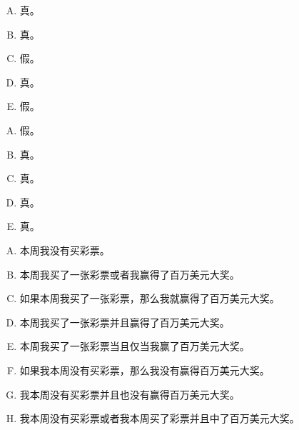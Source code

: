 {{        %
        \begin{practices}
            \begin{enumerate}[A.]
                \item 真。
                \item 真。
                \item 假。
                \item 真。
                \item 假。
            \end{enumerate}
        \end{practices}

        \begin{practices}
            \begin{enumerate}[A.]
                \item 假。
                \item 真。
                \item 真。
                \item 真。
                \item 真。
            \end{enumerate}
        \end{practices}

        \begin{practices}
            \begin{enumerate}[A.]
                \item 本周我没有买彩票。
                \item 本周我买了一张彩票或者我赢得了百万美元大奖。
                \item 如果本周我买了一张彩票，那么我就赢得了百万美元大奖。
                \item 本周我买了一张彩票并且赢得了百万美元大奖。
                \item 本周我买了一张彩票当且仅当我赢了百万美元大奖。
                \item 如果我本周没有买彩票，那么我没有赢得百万美元大奖。
                \item 我本周没有买彩票并且也没有赢得百万美元大奖。
                \item 我本周没有买彩票或者我本周买了彩票并且中了百万美元大奖。
            \end{enumerate}
        \end{practices}

}}
